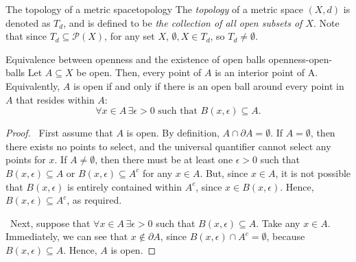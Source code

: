 \documentclass{article}
\newcommand*\iffforward{\par\boxed\Longrightarrow\ }
\newcommand*\iffbackward{\par\boxed\Longleftarrow\ }
\numberwithin{equation}{section}
\numberwithin{figure}{section}
\begin{document}
\begin{definition}{The topology of a metric space}{topology}
    The \emph{topology} of a metric space $ (X, d) $ is denoted as $ T_d $, and
    is defined to be \emph{the collection of all open subsets of $ X $}. Note
    that since $ T_d \subseteq \mathcal{P}(X) $, for any set $ X $, $ \emptyset,
    X \in T_d $, so $ T_d \neq \emptyset $.
\end{definition}
\begin{theorem}{Equivalence between openness and the existence of open balls}
        {openness-open-balls}
    Let $ A \subseteq X $ be open. Then, every point of $ A $ is an interior
    point of A. Equivalently, $ A $ is open if and only if there is an open ball
    around every point in $ A $ that resides within $ A $:
    \begin{equation}
        \forall x \in A\, \exists \epsilon > 0 \text{ such that } B (x,
        \epsilon) \subseteq A.
    \end{equation}

    \begin{minipage}{\dimexpr.6\linewidth-2em}
        \begin{proof}
            \iffforward First assume that $ A $ is open. By definition, $ A \cap
            \partial A = \emptyset $. If $ A = \emptyset $, then there exists no
            points to select, and the universal quantifier cannot select any
            points for $ x $. If $ A \neq \emptyset $, then there must be at
            least one $ \epsilon > 0 $ such that $ B(x, \epsilon) \subseteq A $
            or $ B(x, \epsilon) \subseteq A^c $ for any $ x \in A $. But, since
            $ x \in A $, it is not possible that $ B(x, \epsilon) $ is entirely
            contained within $ A^c $, since $ x \in B(x, \epsilon) $. Hence, $
            B(x, \epsilon) \subseteq A^c $, as required.

            \iffbackward Next, suppose that $ \forall x \in A\, \exists \epsilon
            > 0 $ such that $ B (x, \epsilon) \subseteq A $. Take any $ x \in A
            $.  Immediately, we can see that $ x \not\in \partial A $, since $
            B(x, \epsilon) \cap A^c = \emptyset $, because $ B(x, \epsilon)
            \subseteq A $. Hence, $ A $ is open.
        \end{proof}
    \end{minipage}\hfill
    \begin{minipage}{.4\linewidth}
        \centering
    \end{minipage}
\end{theorem}
\end{document}
